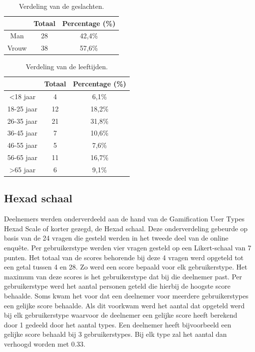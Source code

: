 \begin{table}
\begin{center}
    \begin{tabular}{c|c|c}
        & \textbf{Totaal} & \textbf{Percentage} (\%) \\
        \hline
        Man & 28 & 42,4\% \\
        \hline
        Vrouw & 38 & 57,6\% \\
    \end{tabular}
\end{center}
\caption{Verdeling van de geslachten.}
\label{tab:verdelinggeslacht}
\end{table}

\begin{table}
    \begin{center}
        \begin{tabular}{c|c|c}
            & \textbf{Totaal} & \textbf{Percentage} (\%) \\
            \hline
            <18 jaar & 4 & 6,1\% \\
            \hline
            18-25 jaar & 12 & 18,2\% \\
            \hline
            26-35 jaar & 21 & 31,8\% \\
            \hline
            36-45 jaar & 7 & 10,6\% \\
            \hline
            46-55 jaar & 5 & 7,6\% \\
            \hline
            56-65 jaar & 11 & 16,7\% \\
            \hline
            >65 jaar & 6 & 9,1\% \\
        \end{tabular}
    \end{center}
\caption{Verdeling van de leeftijden.}
\label{tab:verdelingleeftijden}
\end{table}

\subsection{Hexad schaal}

Deelnemers werden onderverdeeld aan de hand van de Gamification User Types Hexad Scale of korter gezegd, de Hexad schaal. Deze onderverdeling gebeurde op basis van de 24 vragen die gesteld werden in het tweede deel van de online enquête. Per gebruikerstype werden vier vragen gesteld op een Likert-schaal van 7 punten. Het totaal van de scores behorende bij deze 4 vragen werd opgeteld tot een getal tussen 4 en 28. Zo werd een score bepaald voor elk gebruikerstype. Het maximum van deze scores is het gebruikerstype dat bij die deelnemer past. Per gebruikerstype werd het aantal personen geteld die hierbij de hoogste score behaalde. Soms kwam het voor dat een deelnemer voor meerdere gebruikerstypes een gelijke score behaalde. Als dit voorkwam werd het aantal dat opgeteld werd bij elk gebruikerstype waarvoor de deelnemer een gelijke score heeft berekend door 1 gedeeld door het aantal types. Een deelnemer heeft bijvoorbeeld een gelijke score behaald bij 3 gebruikerstypes. Bij elk type zal het aantal dan verhoogd worden met 0.33.

